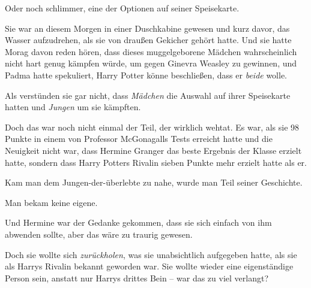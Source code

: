 Oder noch schlimmer, eine der Optionen auf seiner Speisekarte.

Sie war an diesem Morgen in einer Duschkabine gewesen und kurz davor, das Wasser aufzudrehen, als sie von draußen Gekicher gehört hatte. Und sie hatte Morag davon reden hören, dass dieses muggelgeborene Mädchen wahrscheinlich nicht hart genug kämpfen würde, um gegen Ginevra Weasley zu gewinnen, und Padma hatte spekuliert, Harry Potter könne beschließen, dass er \emph{beide} wolle.

Als verstünden sie gar nicht, dass \emph{Mädchen} die Auswahl auf ihrer Speisekarte hatten und \emph{Jungen} um sie kämpften.

Doch das war noch nicht einmal der Teil, der wirklich wehtat. Es war, als sie 98 Punkte in einem von Professor McGonagalls Tests erreicht hatte und die Neuigkeit nicht war, dass Hermine Granger das beste Ergebnis der Klasse erzielt hatte, sondern dass Harry Potters Rivalin sieben Punkte mehr erzielt hatte als er.

Kam man dem Jungen-der-überlebte zu nahe, wurde man Teil seiner Geschichte.

Man bekam keine eigene.

Und Hermine war der Gedanke gekommen, dass sie sich einfach von ihm abwenden sollte, aber das wäre zu traurig gewesen.

Doch sie wollte sich \emph{zurückholen}, was sie unabsichtlich aufgegeben hatte, als sie als Harrys Rivalin bekannt geworden war. Sie wollte wieder eine eigenständige Person sein, anstatt nur Harrys drittes Bein – war das zu viel verlangt?

